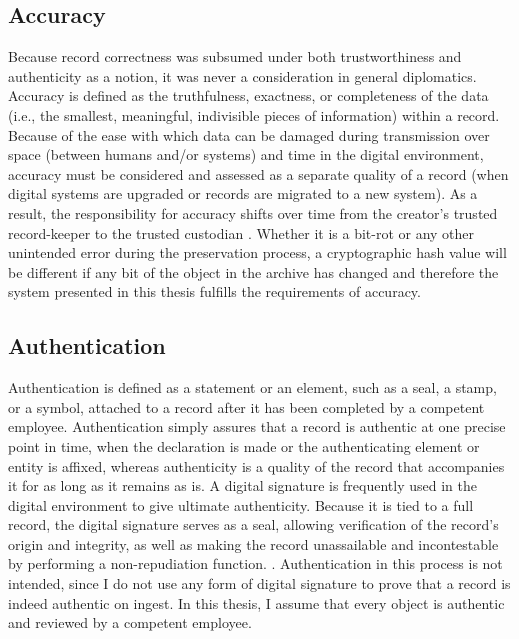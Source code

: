 \documentclass[final]{vutinfth}
\begin{document}
\subsection{Accuracy}
Because record correctness was subsumed under both trustworthiness and authenticity as a notion, it was never a consideration in general diplomatics. Accuracy is defined as the truthfulness, exactness, or completeness of the data (i.e., the smallest, meaningful, indivisible pieces of information) within a record. Because of the ease with which data can be damaged during transmission over space (between humans and/or systems) and time in the digital environment, accuracy must be considered and assessed as a separate quality of a record (when digital systems are upgraded or records are migrated to a new system). As a result, the responsibility for accuracy shifts over time from the creator's trusted record-keeper to the trusted custodian \cite[52]{duranti2009digital}.
Whether it is a bit-rot or any other unintended error during the preservation process, a cryptographic hash value will be different if any bit of the object in the archive has changed and therefore the system presented in this thesis fulfills the requirements of accuracy.

\subsection{Authentication}
Authentication is defined as a statement or an element, such as a seal, a stamp, or a symbol, attached to a record after it has been completed by a competent employee. Authentication simply assures that a record is authentic at one precise point in time, when the declaration is made or the authenticating element or entity is affixed, whereas authenticity is a quality of the record that accompanies it for as long as it remains as is. A digital signature is frequently used in the digital environment to give ultimate authenticity. Because it is tied to a full record, the digital signature serves as a seal, allowing verification of the record's origin and integrity, as well as making the record unassailable and incontestable by performing a non-repudiation function. \cite[53]{duranti2009digital}.
Authentication in this process is not intended, since I do not use any form of digital signature to prove that a record is indeed authentic on ingest. In this thesis, I assume that every object is authentic and reviewed by a competent employee.
\end{document}
